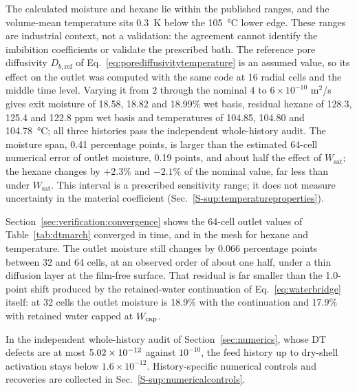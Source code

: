 The calculated moisture and hexane lie within the published ranges, and
the volume-mean temperature sits 0.3~K below the \SI{105}{\celsius} lower edge. These ranges are industrial context, not a validation: the agreement cannot identify the
imbibition coefficients or validate the prescribed bath.
The reference pore diffusivity $D_{b,\mathrm{ref}}$ of
Eq.~\eqref{eq:porediffusivitytemperature} is an assumed value, so its
effect on the outlet was computed with the same code at 16 radial cells
and the middle time level. Varying it from $2$ through the nominal $4$ to
$6\times10^{-10}$ m$^2$/s gives exit moisture of 18.58, 18.82 and 18.99\%
wet basis, residual hexane of 128.3, 125.4 and 122.8 ppm wet basis and
temperatures of 104.85, 104.80 and \SI{104.78}{\celsius}; all three
histories pass the independent whole-history audit. The moisture span,
0.41 percentage points, is larger than the estimated 64-cell numerical
error of outlet moisture, 0.19 points, and about half the effect of
$W_{\mathrm{sat}}$; the hexane changes by $+2.3$\% and $-2.1$\% of the
nominal value, far less than under $W_{\mathrm{sat}}$. This interval is a
prescribed sensitivity range; it does not measure uncertainty in the
material coefficient (Sec.~\ref*{S-sup:temperatureproperties}).

Section~\ref{sec:verification:convergence} shows the 64-cell outlet values
of Table~\ref{tab:dtmarch} converged in time, and in the mesh for hexane and
temperature. The outlet
moisture still changes by 0.066 percentage points between 32 and 64 cells,
at an observed order of about one half, under a thin diffusion layer at the
film-free surface. That residual is far smaller than the 1.0-point shift
produced by the retained-water continuation of Eq.~\eqref{eq:waterbridge}
itself: at 32 cells the outlet moisture is 18.9\% with the continuation and
17.9\% with retained water capped at $W_{\mathrm{cap}}$.

In the independent whole-history audit of Section~\ref{sec:numerics},
whose DT defects are at most $5.02\times10^{-12}$ against $10^{-10}$, the feed
history up to dry-shell activation stays below $1.6\times10^{-12}$.
History-specific numerical controls and recoveries are collected in
Sec.~\ref*{S-sup:numericalcontrols}.

